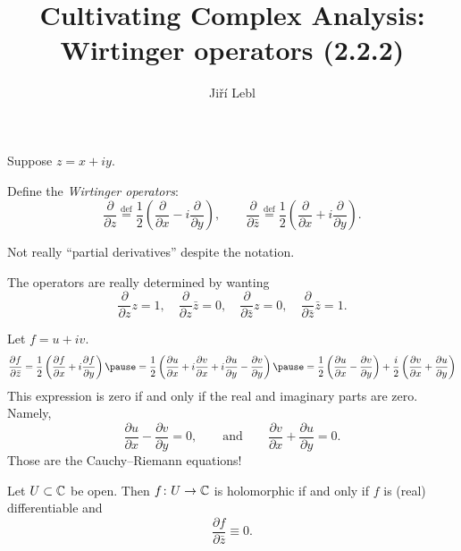 \documentclass[10pt,aspectratio=169]{beamer}
\author{Ji\v{r}\'i Lebl}
\institute[OSU]{%
Departemento pri Matematiko de Oklahoma {\^S}tata Universitato}
\title{Cultivating Complex Analysis:\\%
Wirtinger operators (2.2.2)}
\date{}
\begin{document}
\begin{frame}
\titlepage
\end{frame}

\begin{frame}
Suppose $z=x+iy$.

\medskip
\pause

Define
the \emph{Wirtinger operators}:
\[
\frac{\partial}{\partial z}
\overset{\text{def}}{=}
\frac{1}{2}
\left(
\frac{\partial}{\partial x} - i
\frac{\partial}{\partial y}
\right),
\qquad
\frac{\partial}{\partial \bar{z}}
\overset{\text{def}}{=}
\frac{1}{2}
\left(
\frac{\partial}{\partial x} + i
\frac{\partial}{\partial y}
\right) .
\]

\pause

Not really ``partial derivatives'' despite the notation.

\medskip
\pause

The operators are really determined by wanting
\[
\frac{\partial}{\partial z} z = 1, \quad
\frac{\partial}{\partial z} \bar{z} = 0, \quad
\frac{\partial}{\partial \bar{z}} z = 0, \quad
\frac{\partial}{\partial \bar{z}} \bar{z} = 1.
\]
\end{frame}

\begin{frame}
Let $f = u+iv$.
\[
\frac{\partial f}{\partial \bar{z}} 
=
\frac{1}{2}
\left(
\frac{\partial f}{\partial x} + i
\frac{\partial f}{\partial y}
\right)
\pause
=
\frac{1}{2}
\left(
\frac{\partial u}{\partial x} 
+ i \frac{\partial v}{\partial x} 
+ i \frac{\partial u}{\partial y}
- \frac{\partial v}{\partial y}
\right) 
\pause
=
\frac{1}{2}
\left(
\frac{\partial u}{\partial x} 
- \frac{\partial v}{\partial y}
\right)
+
\frac{i}{2}
\left(
\frac{\partial v}{\partial x} 
+ \frac{\partial u}{\partial y}
\right)
\]
\pause
This expression is zero if and only if the real and imaginary
parts are zero. \pause  Namely,
\[
\frac{\partial u}{\partial x} 
- \frac{\partial v}{\partial y}
= 0,
\qquad
\text{and}
\qquad
\frac{\partial v}{\partial x} 
+ \frac{\partial u}{\partial y} = 0
.
\]
\pause
Those are the Cauchy--Riemann equations!

\pause

\begin{proposition}
Let $U \subset {\mathbb{C}}$ be open.  Then $f \colon U \to {\mathbb{C}}$ is
holomorphic if and only if
$f$ is (real) differentiable and
\begin{equation*}
\frac{\partial f}{\partial \bar{z}} \equiv 0 .
\end{equation*}
\end{proposition}
\end{frame}
\end{document}
